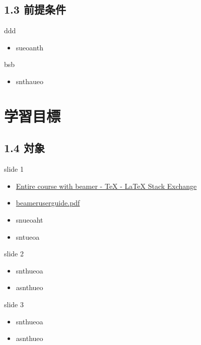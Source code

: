 \documentclass[t]{beamer}
\begin{document}
\subsection{1.3 前提条件}
\label{sec-1-1-3}
\begin{frame}[label=sec-1-1-3-1]{ddd}
\begin{itemize}
\item sueoanth
\end{itemize}
\end{frame}
\begin{frame}[label=sec-1-1-3-2]{bsb}
\begin{itemize}
\item snthaueo
\end{itemize}
\end{frame}
\section{学習目標}
\label{sec-1-2}
\subsection{1.4 対象}
\label{sec-1-2-1}
\begin{frame}[label=sec-1-2-1-1]{slide 1}
\begin{itemize}
\item \href{http://tex.stackexchange.com/questions/52900/entire-course-with-beamer}{Entire course with beamer - \TeX{} - \LaTeX{} Stack Exchange}
\item \href{http://ctan.megagod.net/tex-archive/macros/latex/contrib/beamer/doc/beameruserguide.pdf}{beameruserguide.pdf}
\item snueoaht
\item sntueoa
\end{itemize}
\end{frame}
\begin{frame}[label=sec-1-2-1-2]{slide 2}
\begin{itemize}
\item snthueoa
\item asnthueo
\end{itemize}
\end{frame}
\begin{frame}[label=sec-1-2-1-3]{slide 3}
\begin{itemize}
\item snthueoa
\item asnthueo
\end{itemize}
\end{frame}
\end{document}
